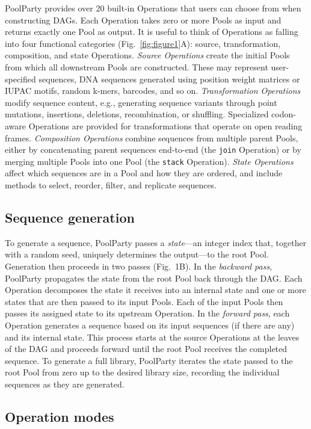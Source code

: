 \documentclass[unnumsec,webpdf,modern,large]{mam-authoring-template}%
\theoremstyle{thmstyleone}%
\theoremstyle{thmstyletwo}%
\theoremstyle{thmstylethree}%
\begin{document}
PoolParty provides over 20 built-in Operations that users can choose from when constructing DAGs. Each Operation takes zero or more Pools as input and returns exactly one Pool as output. It is useful to think of Operations as falling into four functional categories (Fig.~\ref{fig:figure1}A): source, transformation, composition, and state Operations. \emph{Source Operations} create the initial Pools from which all downstream Pools are constructed. These may represent user-specified sequences, DNA sequences generated using position weight matrices or IUPAC motifs, random k-mers, barcodes, and so on. \emph{Transformation Operations} modify sequence content, e.g., generating sequence variants through point mutations, insertions, deletions, recombination, or shuffling. Specialized codon-aware Operations are provided for transformations that operate on open reading frames. \emph{Composition Operations} combine sequences from multiple parent Pools, either by concatenating parent sequences end-to-end (the \texttt{join} Operation) or by merging multiple Pools into one Pool (the \texttt{stack} Operation). \emph{State Operations} affect which sequences are in a Pool and how they are ordered, and include methods to select, reorder, filter, and replicate sequences.

\subsection{Sequence generation}

To generate a sequence, PoolParty passes a \emph{state}---an integer index that, together with a random seed, uniquely determines the output---to the root Pool. Generation then proceeds in two passes (Fig.~1B). In the \emph{backward pass}, PoolParty propagates the state from the root Pool back through the DAG. Each Operation decomposes the state it receives into an internal state and one or more states that are then passed to its input Pools. Each of the input Pools then passes its assigned state to its upstream Operation. In the \emph{forward pass}, each Operation generates a sequence based on its input sequences (if there are any) and its internal state. This process starts at the source Operations at the leaves of the DAG and proceeds forward until the root Pool receives the completed sequence. To generate a full library, PoolParty iterates the state passed to the root Pool from zero up to the desired library size, recording the individual sequences as they are generated.

\subsection{Operation modes}
\end{document}
